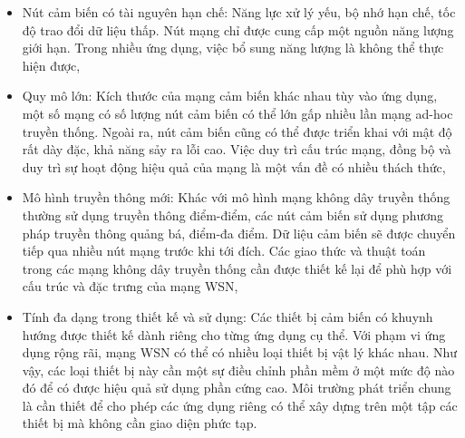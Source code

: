 \begin{itemize}
\item	Nút cảm biến có tài nguyên hạn chế: Năng lực xử lý yếu, bộ nhớ hạn chế, tốc độ trao đổi dữ liệu thấp. Nút mạng chỉ được cung cấp một nguồn năng lượng giới hạn. Trong nhiều ứng dụng, việc bổ sung năng lượng là không thể thực hiện được,
\item	Quy mô lớn: Kích thước của mạng cảm biến khác nhau tùy vào ứng dụng, một số mạng có số lượng nút cảm biến có thể lớn gấp nhiều lần mạng ad-hoc truyền thống. Ngoài ra, nút cảm biến cũng có thể được triển khai với mật độ rất dày đặc, khả năng sảy ra lỗi cao. Việc duy trì cấu trúc mạng, đồng bộ và duy trì sự hoạt động hiệu quả của mạng là một vấn đề có nhiều thách thức,
\item	Mô hình truyền thông mới: Khác với mô hình mạng không dây truyền thống thường sử dụng truyền thông điểm-điểm, các nút cảm biến sử dụng phương pháp truyền thông quảng bá, điểm-đa điểm. Dữ liệu cảm biến sẽ được chuyển tiếp qua nhiều nút mạng trước khi tới đích. Các giao thức và thuật toán trong các mạng không dây truyền thống cần được thiết kế lại để phù hợp với cấu trúc và đặc trưng của mạng WSN,
\item	Tính đa dạng trong thiết kế và sử dụng: Các thiết bị cảm biến có khuynh hướng được thiết kế dành riêng cho từng ứng dụng cụ thể. Với phạm vi ứng dụng rộng rãi, mạng WSN có thể có nhiều loại thiết bị vật lý khác nhau. Như vậy, các loại thiết bị này cần một sự điều chỉnh phần mềm ở một mức độ nào đó để có được hiệu quả sử dụng phần cứng cao. Môi trường phát triển chung là cần thiết để cho phép các ứng dụng riêng có thể xây dựng trên một tập các thiết bị mà không cần giao diện phức tạp.

\end{itemize}

